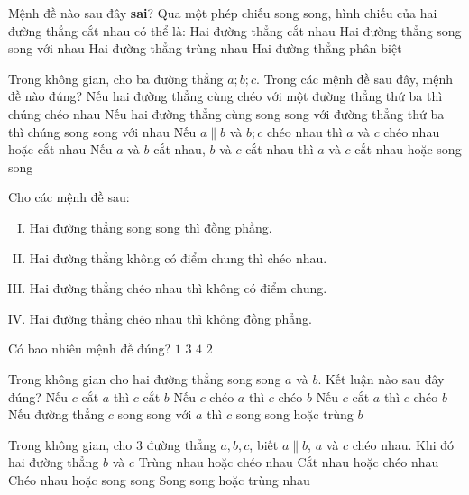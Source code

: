 \begin{ex}%
	Mệnh đề nào sau đây \textbf{sai}? Qua một phép chiếu song song, hình chiếu của hai đường thẳng cắt nhau có thể là:
	\choice
	{Hai đường thẳng cắt nhau}
	{\True Hai đường thẳng song song với nhau}
	{Hai đường thẳng trùng nhau}
	{Hai đường thẳng phân biệt}
	\loigiai{
	}
\end{ex}
\begin{ex}%
	Trong không gian, cho ba đường thẳng $a;b;c$. Trong các mệnh đề sau đây, mệnh đề nào đúng?
	\choice
	{Nếu hai đường thẳng cùng chéo với một đường thẳng thứ ba thì chúng chéo nhau}
	{Nếu hai đường thẳng cùng song song với đường thẳng thứ ba thì chúng song song với nhau}
	{\True Nếu $a\parallel b$ và $b;c$ chéo nhau thì $a$ và $c$ chéo nhau hoặc cắt nhau}
	{Nếu $a$ và $b$ cắt nhau, $b$ và $c$ cắt nhau thì $a$ và $c$ cắt nhau hoặc song song}
	\loigiai{
	}
\end{ex}
\begin{ex}%
	Cho các mệnh đề sau:
	\begin{enumerate}[(I)]
		\item Hai đường thẳng song song thì đồng phẳng.
		\item Hai đường thẳng không có điểm chung thì chéo nhau.
		\item Hai đường thẳng chéo nhau thì không có điểm chung.
		\item Hai đường thẳng chéo nhau thì không đồng phẳng.
	\end{enumerate}
	Có bao nhiêu mệnh đề đúng?
	\choice
	{$1$}
	{\True $3$}
	{$4$}
	{$2$}
	\loigiai{
	}
\end{ex}
\begin{ex}%
	Trong không gian cho hai đường thẳng song song $a$ và $b$. Kết luận nào sau đây đúng?
	\choice
	{Nếu $c$ cắt $a$ thì $c$ cắt $b$}
	{Nếu $c$ chéo $a$ thì $c$ chéo $b$}
	{Nếu $c$ cắt $a$ thì $c$ chéo $b$}
	{\True Nếu đường thẳng $c$ song song với $a$ thì $c$ song song hoặc trùng $b$}
	\loigiai{
	}
\end{ex}
\begin{ex}%
	Trong không gian, cho $3$ đường thẳng $a, b, c$, biết $a\parallel b$, $a$ và $c$ chéo nhau. Khi đó hai đường thẳng $b$ và $c$
	\choice
	{Trùng nhau hoặc chéo nhau}
	{\True Cắt nhau hoặc chéo nhau}
	{Chéo nhau hoặc song song}
	{Song song hoặc trùng nhau}
\end{ex}
